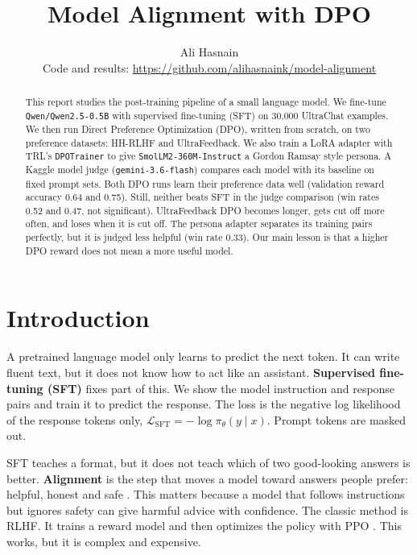 \documentclass[10pt]{article}
\title{\textbf{Model Alignment with DPO}}
\author{Ali Hasnain\\[2pt]\small Code and results: \url{https://github.com/alihasnaink/model-alignment}}
\date{}
\newcommand{\code}[1]{\texttt{\small #1}}
\begin{document}
\maketitle

\begin{abstract}
\noindent
This report studies the post-training pipeline of a small language model. We fine-tune \code{Qwen/Qwen2.5-0.5B} with
supervised fine-tuning (SFT) on 30,000 UltraChat examples. We then run Direct Preference Optimization (DPO), written
from scratch, on two preference datasets: HH-RLHF and UltraFeedback. We also train a LoRA adapter with TRL's
\code{DPOTrainer} to give \code{SmolLM2-360M-Instruct} a Gordon Ramsay style persona. A Kaggle model judge
(\code{gemini-3.6-flash}) compares each model with its baseline on fixed prompt sets. Both DPO runs learn their
preference data well (validation reward accuracy 0.64 and 0.75). Still, neither beats SFT in the judge comparison
(win rates 0.52 and 0.47, not significant). UltraFeedback DPO becomes longer, gets cut off more often, and loses
when it is cut off. The persona adapter separates its training pairs perfectly, but it is judged less helpful
(win rate 0.33). Our main lesson is that a higher DPO reward does not mean a more useful model.
\end{abstract}

\section{Introduction}
A pretrained language model only learns to predict the next token. It can write fluent text, but it does not know
how to act like an assistant. \textbf{Supervised fine-tuning (SFT)} fixes part of this. We show the model
instruction and response pairs and train it to predict the response. The loss is the negative log likelihood of the
response tokens only, $\mathcal{L}_{\text{SFT}} = -\log \pi_\theta(y \mid x)$. Prompt tokens are masked out.

SFT teaches a format, but it does not teach which of two good-looking answers is better. \textbf{Alignment} is the
step that moves a model toward answers people prefer: helpful, honest and safe \cite{ouyang2022,bai2022}. This
matters because a model that follows instructions but ignores safety can give harmful advice with confidence. The
classic method is RLHF. It trains a reward model and then optimizes the policy with PPO \cite{ouyang2022}. This works,
but it is complex and expensive.
\end{document}
